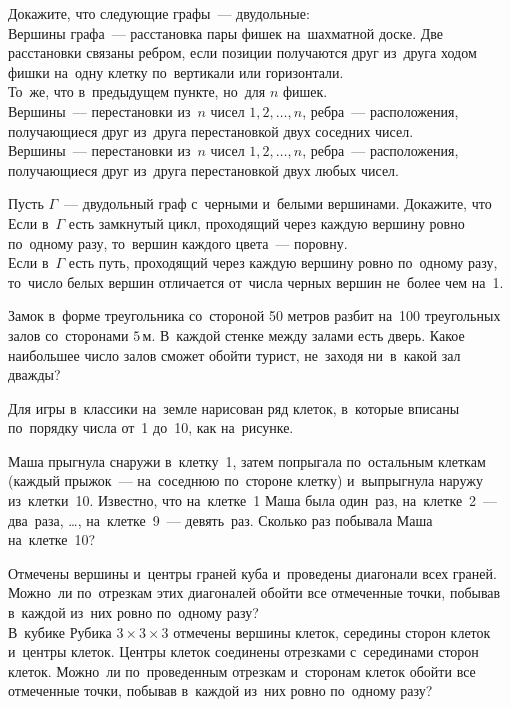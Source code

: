 \begin{problems}

\item
Докажите, что следующие графы~--- двудольные:
\\
\subproblem
Вершины графа~--- расстановка пары фишек на~шахматной доске.
Две расстановки связаны ребром, если позиции получаются друг из~друга ходом
фишки на~одну клетку по~вертикали или горизонтали.
\\
\subproblem
То~же, что в~предыдущем пункте, но~для $n$ фишек.
\\
\subproblem
Вершины~--- перестановки из~$n$ чисел $1, 2, \ldots, n$, ребра~---
расположения, получающиеся друг из~друга перестановкой двух соседних чисел.
\\
\subproblem
Вершины~--- перестановки из~$n$ чисел $1, 2, \ldots, n$, ребра~---
расположения, получающиеся друг из~друга перестановкой двух любых чисел.

\item
Пусть $\Gamma$~--- двудольный граф с~черными и~белыми вершинами.
Докажите, что
\\
\subproblem
Если в~$\Gamma$ есть замкнутый цикл, проходящий через каждую вершину ровно
по~одному разу, то~вершин каждого цвета~--- поровну.
\\
\subproblem
Если в~$\Gamma$ есть путь, проходящий через каждую вершину ровно по~одному
разу, то~число белых вершин отличается от~числа черных вершин не~более чем
на~1.


\item
Замок в~форме треугольника со~стороной 50 метров разбит на~100 треугольных
залов со~сторонами $5\,\text{м}$.
В~каждой стенке между залами есть дверь.
Какое наибольшее число залов сможет обойти турист, не~заходя ни~в~какой зал
дважды?

\item
Для игры в~классики на~земле нарисован ряд клеток, в~которые вписаны по~порядку
числа от~1 до~10, как на~рисунке.
\begin{center}
\end{center}
Маша прыгнула снаружи в~клетку~1, затем попрыгала по~остальным клеткам
(каждый прыжок~--- на~соседнюю по~стороне клетку) и~выпрыгнула наружу
из~клетки~10.
Известно, что на~клетке~1 Маша была один~раз, на~клетке~2~--- два~раза, \ldots,
на~клетке~9~--- девять~раз.
Сколько раз побывала Маша на~клетке~10?

\item
\subproblem
Отмечены вершины и~центры граней куба и~проведены диагонали всех граней.
Можно~ли по~отрезкам этих диагоналей обойти все отмеченные точки, побывав
в~каждой из~них ровно по~одному разу?
\\
\subproblem
В~кубике Рубика $3 \times 3 \times 3$ отмечены вершины клеток, середины сторон
клеток и~центры клеток.
Центры клеток соединены отрезками с~серединами сторон клеток.
Можно~ли по~проведенным отрезкам и~сторонам клеток обойти все отмеченные точки,
побывав в~каждой из~них ровно по~одному разу?

\end{problems}

